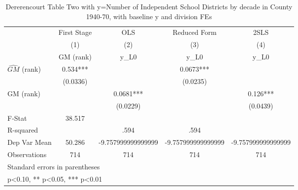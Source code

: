 \begin{table}[htbp]\centering
\def\sym#1{\ifmmode^{#1}\else\(^{#1}\)\fi}
\caption{Dererencourt Table Two with y=Number of Independent School Districts by decade in County 1940-70, with baseline y and division FEs}
\begin{tabular}{l*{4}{c}}
\toprule
                    & First Stage   &         OLS   &Reduced Form   &        2SLS   \\
                    &\multicolumn{1}{c}{(1)}&\multicolumn{1}{c}{(2)}&\multicolumn{1}{c}{(3)}&\multicolumn{1}{c}{(4)}\\
                    &\multicolumn{1}{c}{GM  (rank)}&\multicolumn{1}{c}{y\_L0}&\multicolumn{1}{c}{y\_L0}&\multicolumn{1}{c}{y\_L0}\\
\midrule
$\hat{GM}$ (rank)   &       0.534***&               &      0.0673***&               \\
                    &    (0.0336)   &               &    (0.0235)   &               \\
\addlinespace
GM  (rank)          &               &      0.0681***&               &       0.126***\\
                    &               &    (0.0229)   &               &    (0.0439)   \\
\midrule
F-Stat              &      38.517   &               &               &               \\
R-squared           &               &        .594   &        .594   &               \\
Dep Var Mean        &      50.286   &-9.757999999999999   &-9.757999999999999   &-9.757999999999999   \\
Observations        &         714   &         714   &         714   &         714   \\
\bottomrule
\multicolumn{5}{l}{\footnotesize Standard errors in parentheses}\\
\multicolumn{5}{l}{\footnotesize * p<0.10, ** p<0.05, *** p<0.01}\\
\end{tabular}
\end{table}

